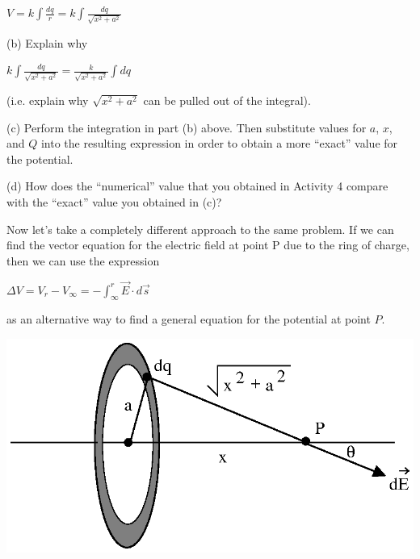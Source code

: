 {\centering \( V=k\int \frac{dq}{r}=k\int \frac{dq}{\sqrt{x^{2}+a^{2}}} \)\par}
\vspace{25mm}

(b) Explain why

{\centering \( k\int \frac{dq}{\sqrt{x^{2}+a^{2}}}=\frac{k}{\sqrt{x^{2}+a^{2}}}\int dq \)\par}

(i.e. explain why \( \sqrt{x^{2}+a^{2}} \) can be pulled out of the integral).
\vspace{20mm}

(c) Perform the integration in part (b) above. Then substitute values
for $a$, $x$, and $Q$ into the resulting expression in order to obtain a
more {}``exact'' value for the potential.
\vspace{25mm}

(d) How does the {}``numerical'' value that you obtained in Activity
4 compare with the {}``exact'' value you obtained in (c)?
\vspace{20mm}

Now let's take a completely different approach to the same problem.
If we can find the vector equation for the electric field at point
P due to the ring of charge, then we can use the expression

{\centering \( \Delta V=V_{r}-V_{\infty }=-\int ^{r}_{\infty }\overrightarrow{E}\cdot d\overrightarrow{s} \)\par}

as an alternative way to find a general equation for the potential
at point $P$.

\vspace{0.3cm}
{\centering \includegraphics{electric_potential_fig_6.eps} \par}
\vspace{0.3cm}

